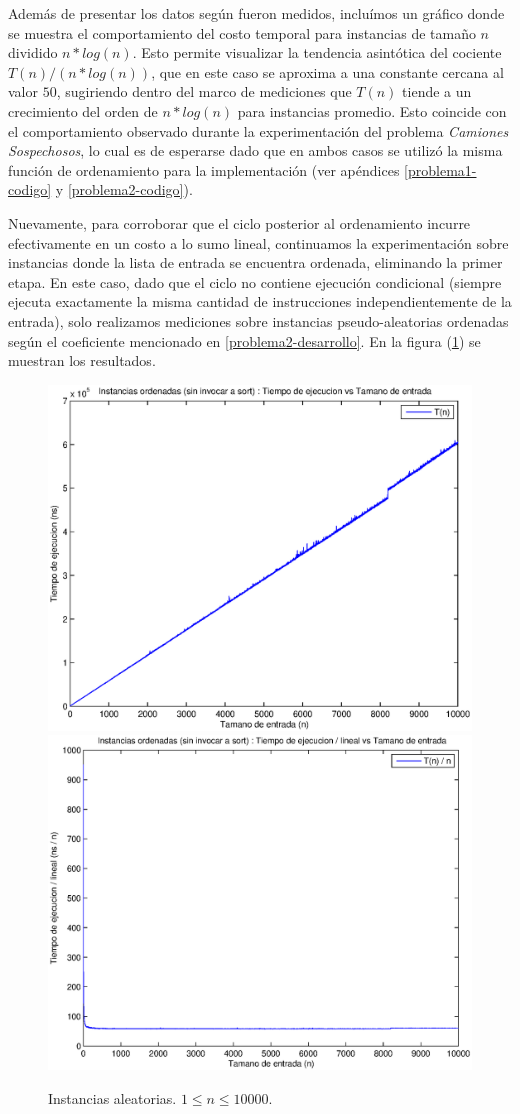 Además de presentar los datos según fueron medidos, incluímos un gráfico donde se muestra el comportamiento del costo temporal para instancias de tamaño $n$ dividido $n * log(n)$. Esto permite visualizar la tendencia asintótica del cociente $T(n) / (n * log(n))$, que en este caso se aproxima a una constante cercana al valor $50$, sugiriendo dentro del marco de mediciones que $T(n)$ tiende a un crecimiento del orden de $n * log(n)$ para instancias promedio. Esto coincide con el comportamiento observado durante la experimentación del problema \emph{Camiones Sospechosos}, lo cual es de esperarse dado que en ambos casos se utilizó la misma función de ordenamiento para la implementación (ver apéndices \ref{problema1-codigo} y \ref{problema2-codigo}).

Nuevamente, para corroborar que el ciclo posterior al ordenamiento incurre efectivamente en un costo a lo sumo lineal, continuamos la experimentación sobre instancias donde la lista de entrada se encuentra ordenada, eliminando la primer etapa. En este caso, dado que el ciclo no contiene ejecución condicional (siempre ejecuta exactamente la misma cantidad de instrucciones independientemente de la entrada), solo realizamos mediciones sobre instancias pseudo-aleatorias ordenadas según el coeficiente mencionado en \ref{problema2-desarrollo}. En la figura (\ref{fig:problema2-ciclo}) se muestran los resultados.

\begin{center}
  \begin{figure}[H]
    \includegraphics[width=0.5\linewidth]{problema2/graficos/problema2_ordenada_10000.eps}
    \includegraphics[width=0.5\linewidth]{problema2/graficos/problema2_ordenada_10000_div_n.eps}
  \caption{Instancias aleatorias. $1 \leq n \leq 10000$.}
  \label{fig:problema2-ciclo}
  \end{figure}
\end{center}


